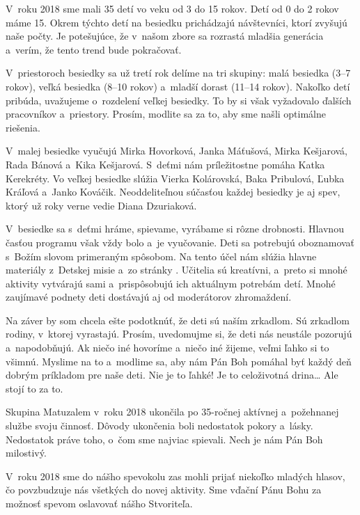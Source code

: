 

V~roku 2018 sme mali 35 detí vo veku od 3 do 15 rokov. Detí od 0 do 2 rokov máme 15. Okrem týchto detí na besiedku prichádzajú návštevníci, ktorí zvyšujú naše počty. Je potešujúce, že v~našom zbore sa rozrastá mladšia generácia a~verím, že tento trend bude pokračovať.

V~priestoroch besiedky sa už tretí rok delíme na tri skupiny: malá besiedka (3--7 rokov), veľká besiedka (8--10 rokov) a~mladší dorast (11--14 rokov). Nakoľko detí pribúda, uvažujeme o~rozdelení veľkej besiedky. To by si však vyžadovalo ďalších pracovníkov a~priestory. Prosím, modlite sa za to, aby sme našli optimálne riešenia.

V~malej besiedke vyučujú Mirka Hovorková, Janka Máťušová, Mirka Kešjarová, Rada Bánová a~Kika Kešjarová. S~deťmi nám príležitostne pomáha Katka Kerekréty. Vo veľkej besiedke slúžia Vierka Kolárovská, Baka Pribulová, Ľubka Kráľová a~Janko Kováčik. Neoddeliteľnou súčasťou každej besiedky je aj spev, ktorý už roky verne vedie Diana Dzuriaková.

V~besiedke sa s~deťmi hráme, spievame, vyrábame si rôzne drobnosti. Hlavnou časťou programu však vždy bolo a~je vyučovanie. Deti sa potrebujú oboznamovať s~Božím slovom primeraným spôsobom. Na tento účel nám slúžia hlavne materiály z~Detskej misie a~zo stránky . Učitelia sú kreatívni, a~preto si mnohé aktivity vytvárajú sami a~prispôsobujú ich aktuálnym potrebám detí. Mnohé zaujímavé podnety deti dostávajú aj od moderátorov zhromaždení.

Na záver by som chcela ešte podotknúť, že deti sú naším zrkadlom. Sú zrkadlom rodiny, v~ktorej vyrastajú. Prosím, uvedomujme si, že deti nás neustále pozorujú a~napodobňujú. Ak niečo iné hovoríme a~niečo iné žijeme, veľmi ľahko si to všimnú. Myslime na to a~modlime sa, aby nám Pán Boh pomáhal byť každý deň dobrým príkladom pre naše deti. Nie je to ľahké! Je to celoživotná drina… Ale stojí to za to.



Skupina Matuzalem v~roku 2018 ukončila po 35-ročnej aktívnej a~požehnanej službe svoju činnosť.  Dôvody ukončenia boli nedostatok pokory a~lásky. Nedostatok práve toho, o~čom sme najviac spievali.
Nech je nám Pán Boh milostivý.



V~roku 2018 sme do nášho spevokolu zas mohli prijať niekoľko mladých hlasov, čo povzbudzuje nás všetkých do novej aktivity. Sme vďační Pánu Bohu za možnosť spevom oslavovať nášho Stvoriteľa.

